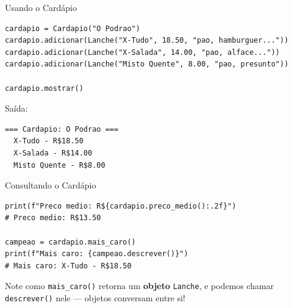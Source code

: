 \documentclass[aspectratio=169]{beamer}
\begin{document}
\begin{frame}[fragile]{Usando o Cardápio}
  \begin{lstlisting}
cardapio = Cardapio("O Podrao")
cardapio.adicionar(Lanche("X-Tudo", 18.50, "pao, hamburguer..."))
cardapio.adicionar(Lanche("X-Salada", 14.00, "pao, alface..."))
cardapio.adicionar(Lanche("Misto Quente", 8.00, "pao, presunto"))

cardapio.mostrar()
  \end{lstlisting}

  Saída:
  \begin{lstlisting}[numbers=none]
=== Cardapio: O Podrao ===
  X-Tudo - R$18.50
  X-Salada - R$14.00
  Misto Quente - R$8.00
  \end{lstlisting}
\end{frame}

\begin{frame}[fragile]{Consultando o Cardápio}
  \begin{lstlisting}
print(f"Preco medio: R${cardapio.preco_medio():.2f}")
# Preco medio: R$13.50

campeao = cardapio.mais_caro()
print(f"Mais caro: {campeao.descrever()}")
# Mais caro: X-Tudo - R$18.50
  \end{lstlisting}

  \vspace{0.5cm}
  Note como \texttt{mais\_caro()} retorna um \textbf{objeto} \texttt{Lanche},
  e podemos chamar \texttt{descrever()} nele --- objetos conversam entre si!
\end{frame}
\end{document}
